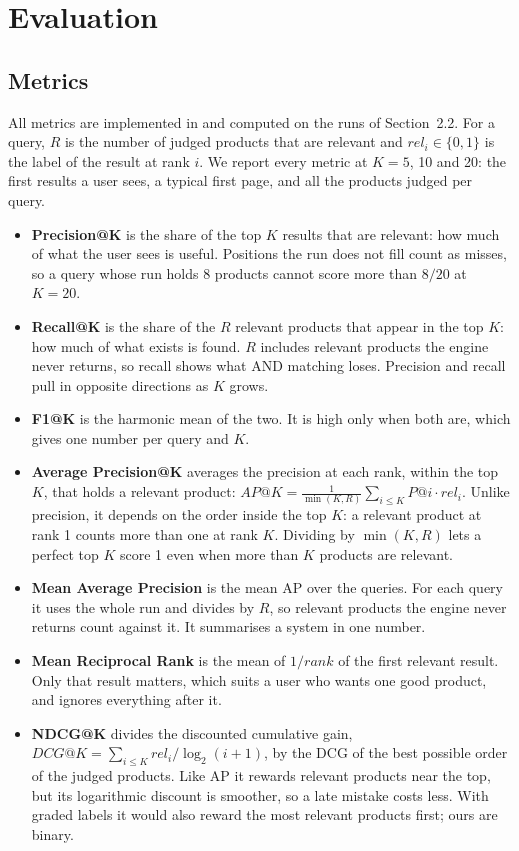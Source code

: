 \documentclass[11pt,a4paper]{article}
\begin{document}
\section{Evaluation}

\subsection{Metrics}
\label{sec:metrics}

All metrics are implemented in  and computed on the runs of
Section~2.2. For a query, $R$ is the number of judged products that are
relevant and $\mathit{rel}_i \in \{0, 1\}$ is the label of the result at rank
$i$. We report every metric at $K = 5$, 10 and 20: the first results a user
sees, a typical first page, and all the products judged per query.

\begin{itemize}
  \item \textbf{Precision@K} is the share of the top $K$ results that are
    relevant: how much of what the user sees is useful. Positions the run does
    not fill count as misses, so a query whose run holds 8 products cannot score
    more than $8/20$ at $K = 20$.
  \item \textbf{Recall@K} is the share of the $R$ relevant products that appear
    in the top $K$: how much of what exists is found. $R$ includes relevant
    products the engine never returns, so recall shows what AND matching loses.
    Precision and recall pull in opposite directions as $K$ grows.
  \item \textbf{F1@K} is the harmonic mean of the two. It is high only when both
    are, which gives one number per query and $K$.
  \item \textbf{Average Precision@K} averages the precision at each rank, within
    the top $K$, that holds a relevant product:
    $\mathit{AP@K} = \frac{1}{\min(K, R)} \sum_{i \le K} \mathit{P@i} \cdot
    \mathit{rel}_i$. Unlike precision, it depends on the order inside the top
    $K$: a relevant product at rank 1 counts more than one at rank $K$.
    Dividing by $\min(K, R)$ lets a perfect top $K$ score 1 even when more than
    $K$ products are relevant.
  \item \textbf{Mean Average Precision} is the mean AP over the queries. For each
    query it uses the whole run and divides by $R$, so relevant products the
    engine never returns count against it. It summarises a system in one number.
  \item \textbf{Mean Reciprocal Rank} is the mean of $1/\mathit{rank}$ of the
    first relevant result. Only that result matters, which suits a user who
    wants one good product, and ignores everything after it.
  \item \textbf{NDCG@K} divides the discounted cumulative gain,
    $\mathit{DCG@K} = \sum_{i \le K} \mathit{rel}_i / \log_2(i + 1)$, by the
    DCG of the best possible order of the judged products. Like AP it rewards
    relevant products near the top, but its logarithmic discount is smoother,
    so a late mistake costs less. With graded labels it would also reward the
    most relevant products first; ours are binary.
\end{itemize}
\end{document}
